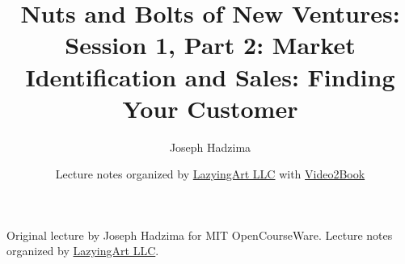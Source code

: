 \documentclass[11pt,oneside]{book}
\begin{document}
\frontmatter
\title{Nuts and Bolts of New Ventures: Session 1, Part 2: Market Identification and Sales: Finding Your Customer}
\author{Joseph Hadzima}
\date{Lecture notes organized by \href{https://lazying.art}{LazyingArt LLC} with \href{https://github.com/lachlanchen/Video2Book}{Video2Book}}
\maketitle
\begin{center}
\small Original lecture by Joseph Hadzima for MIT OpenCourseWare. Lecture notes organized by \href{https://lazying.art}{LazyingArt LLC}.
\end{center}
\clearpage
\mainmatter

\end{document}
